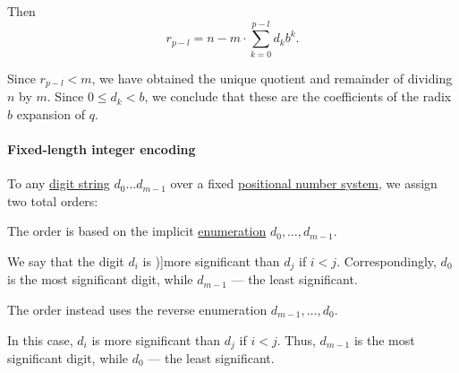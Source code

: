 \begin{defproof}
  Then
  \begin{equation*}
    r_{p-l} = n - m \cdot \sum_{k=0}^{p-l} d_k b^k.
  \end{equation*}

  Since \( r_{p-l} < m \), we have obtained the unique quotient and remainder of dividing \( n \) by \( m \). Since \( 0 \leq d_k < b \), we conclude that these are the coefficients of the radix \( b \) expansion of \( q \).
\end{defproof}

\paragraph{Fixed-length integer encoding}

\begin{definition}\label{def:endianness}\mimprovised
  To any \hyperref[def:positional_number_system]{digit string} \( d_0 \ldots d_{m-1} \) over a fixed \hyperref[def:positional_number_system]{positional number system}, we assign two total orders:

  \begin{thmenum}
     The  order is based on the implicit \hyperref[def:enumeration]{enumeration} \( d_0, \ldots, d_{m-1} \).

    We say that the digit \( d_i \) is \term[en=more significant (\cite[195]{Knuth1997ArtVol2})]{more significant} than \( d_j \) if \( i < j \). Correspondingly, \( d_0 \) is the most significant digit, while \( d_{m-1} \) --- the least significant.

     The  order instead uses the reverse enumeration \( d_{m-1}, \ldots, d_0 \).

    In this case, \( d_i \) is more significant than \( d_j \) if \( i < j \). Thus, \( d_{m-1} \) is the most significant digit, while \( d_0 \) --- the least significant.
  \end{thmenum}
\end{definition}
